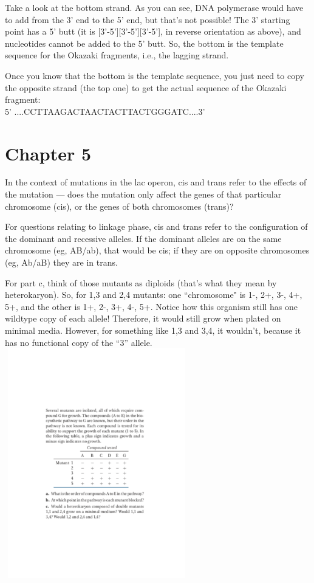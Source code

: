 \documentclass[11pt]{article}
\begin{document}
Take a look at the bottom strand. As you can see, DNA polymerase would have to add from the 3' end to the 5' end, but that's not possible! The 3' starting point has a 5' butt (it is [3'-5'][3'-5'][3'-5'], in reverse orientation as above), and nucleotides cannot be added to the 5' butt. So, the bottom is the template sequence for the Okazaki fragments, i.e., the lagging strand. 

Once you know that the bottom is the template sequence, you just need to copy the opposite strand (the top one) to get the actual sequence of the Okazaki fragment:\\

5' ....CCTTAAGACTAACTACTTACTGGGATC....3'

\section{Chapter 5}

In the context of mutations in the lac operon, cis and trans refer to the effects of the mutation --- does the mutation only affect the genes of that particular chromosome (cis), or the genes of both chromosomes (trans)? 

For questions relating to linkage phase, cis and trans refer to the configuration of the dominant and recessive alleles. If the dominant alleles are on the same chromosome (eg, AB/ab), that would be cis; if they are on opposite chromosomes (eg, Ab/aB) they are in trans. 

For part c, think of those mutants as diploids (that’s what they mean by heterokaryon). So, for 1,3 and 2,4 mutants: one ``chromosome" is 1-, 2+, 3-, 4+, 5+, and the other is 1+, 2-, 3+, 4-, 5+. Notice how this organism still has one wildtype copy of each allele! Therefore, it would still grow when plated on minimal media. However, for something like 1,3 and 3,4, it wouldn’t, because it has no functional copy of the “3” allele.\\ 

\includegraphics[width=8cm, height=10cm]{heterokaryon}
\end{document}
